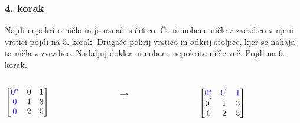 \documentclass{beamer}
\begin{document}
\begin{frame}
    \frametitle{4. korak}
    \begin{block}{}
        Najdi nepokrito ničlo in jo označi s črtico. Če ni nobene ničle z zvezdico
        v njeni vrstici pojdi na 5. korak. Drugače pokrij vrstico in odkrij stolpec,
        kjer se nahaja ta ničla z zvezdico. Nadaljuj dokler ni nobene nepokrite ničle več.
        Pojdi na 6. korak.
    \end{block}
    \hfill
    \begin{columns}[t]
        \begin{column}{0.25\linewidth}
            $\begin{bmatrix}
                \textcolor{blue}{0^{*}} & 0 & 1\\
                \textcolor{blue}{0} & 1 & 3\\
                \textcolor{blue}{0} & 2 & 5\\	
            \end{bmatrix}$
        \end{column}
        \begin{column}{0.25\linewidth}
         \centering
         $ \rightarrow $
        \end{column}
        \hfill
        \begin{column}{0.25\linewidth}
            \centering
            $\begin{bmatrix}
                \textcolor{blue}{0^{*}} & \textcolor{blue}{0^{'}} & \textcolor{blue}{1}\\
                0^{'} & 1 & 3\\
                0 & 2 & 5\\	
            \end{bmatrix}$
        \end{column}
    \end{columns}
\end{frame}
\end{document}
